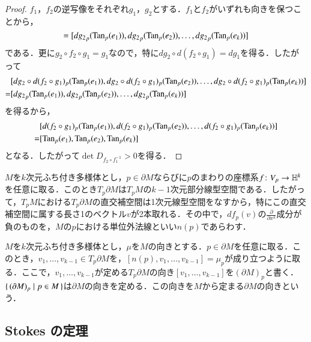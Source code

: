 \begin{proof}$f_1$，$f_2$の逆写像をそれぞれ$g_1$，$g_2$とする．$f_1$と$f_2$がいずれも向きを保つことから，
\begin{equation}
[d{g_1}_p(\Tan_p(e_1)), d{g_1}_p(\Tan_p(e_2)), \dots, d{g_1}_p(\Tan_p(e_k))] = [d{g_2}_p(\Tan_p(e_1)), d{g_2}_p(\Tan_p(e_2)), \dots, d{g_2}_p(\Tan_p(e_k))]
\end{equation}
である．更に$g_2 \circ f_2 \circ g_1 = g_1$なので，特に$dg_2 \circ d(f_2 \circ g_1) = dg_1$を得る．したがって
\begin{align}
& [dg_2 \circ d(f_2 \circ g_1)_p(\operatorname{Tan}_p(e_1)), dg_2 \circ d(f_2 \circ g_1)_p(\operatorname{Tan}_p(e_2)), \dots, dg_2 \circ d(f_2 \circ g_1)_p(\operatorname{Tan}_p(e_k))] \\
= &[d{g_2}_p(\operatorname{Tan}_p(e_1)), d{g_2}_p(\operatorname{Tan}_p(e_2)), \dots, d{g_2}_p(\operatorname{Tan}_p(e_k))]
\end{align}を得るから，
\begin{align}
& [d(f_2 \circ g_1)_p(\operatorname{Tan}_p(e_1)), d(f_2 \circ g_1)_p(\operatorname{Tan}_p(e_2)), \dots, d(f_2 \circ g_1)_p(\operatorname{Tan}_p(e_k))] \\
= &[\operatorname{Tan}_p(e_1), \operatorname{Tan}_p(e_2), \operatorname{Tan}_p(e_k)]
\end{align}となる．したがって$\det D_{f_2 \circ f_1^{-1}} > 0$を得る．
\end{proof}

\begin{defi}
$M$を$k$次元ふち付き多様体とし，$p \in \partial M$ならびに$p$のまわりの座標系$f \colon V_p \to \mathbb{H}^k$を任意に取る．このとき$T_p \partial M$は$T_pM$の$k-1$次元部分線型空間である．したがって，$T_pM$における$T_p \partial M$の直交補空間は1次元線型空間をなすから，特にこの直交補空間に属する長さ1のベクトル$v$が2本取れる．その中で，$df_p(v)$の$\frac{\partial}{\partial x^k}$成分が負のものを，$M$の$p$における単位外法線といい$n(p)$であらわす．
\end{defi}

\begin{defi}
$M$を$k$次元ふち付き多様体とし，$\mu$を$M$の向きとする．$p \in \partial M$を任意に取る．このとき，$v_1, \dots, v_{k-1} \in T_p \partial M$を，$[n(p), v_1, \dots, v_{k-1}] = \mu_p$が成り立つように取る．ここで，$v_1, \dots, v_{k-1}$が定める$T_p \partial M$の向き$[v_1, \dots, v_{k-1}]$を$(\partial M)_p$と書く．$\set{(\partial M)_p | p \in M}$は$\partial M$の向きを定める．この向きを$M$から定まる$\partial M$の向きという．
\end{defi}

\subsection{Stokes の定理}


